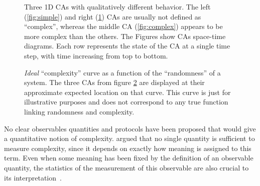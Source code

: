 \begin{figure}[htbp]
\begin{subfigure}[b]{.31\linewidth}
    \caption{}
   \label{fig:random}
  \end{subfigure}
  \caption{Three 1D \aclp{CA} with qualitatively different behavior. The left
    (\ref{fig:simple}) and right (\ref{fig:random}) \acp{CA} are usually not
    defined as ``complex'', whereas the middle \ac{CA} (\ref{fig:complex})
    appears to be more complex than the others. The Figures show \acp{CA} space-time 
    diagrams. Each row represents the state of the \ac{CA} at a single time step, with 
    time increasing from top to bottom.}
  \label{fig:three_eca_complex}
\end{figure}

\begin{figure}[htbp]
  \centering
\caption{\emph{Ideal} ``complexity'' curve as a function of the ``randomness''
  of a system. The three \acp{CA} from figure \ref{fig:three_eca_complex} are
  displayed at their approximate expected location on that curve. This curve is
  just for illustrative purposes and does not correspond to any true function
  linking randomness and complexity.}
\label{fig:complexity_curve}
\end{figure}

No clear observables quantities and protocols have been proposed that would give a
quantitative notion of complexity.
\textcite{grassbergerProblemsQuantifyingSelfgenerated1989} argued that no single
quantity is sufficient to measure complexity, since it depends on exactly how
meaning is assigned to this term. Even when some meaning has been fixed by the
definition of an observable quantity, the statistics of the measurement of this
observable are also crucial to its
interpretation~\parencite{gutowitzCellularAutomataSciences1995}.

